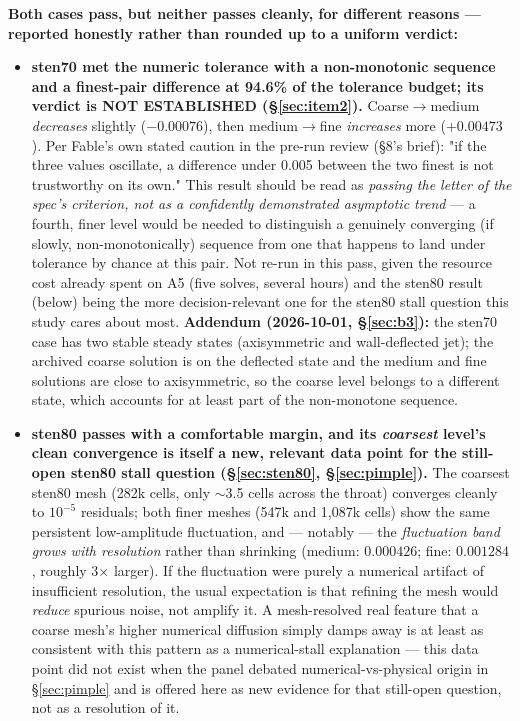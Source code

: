 \documentclass[11pt]{article}
\begin{document}
\textbf{Both cases pass, but neither passes cleanly, for different reasons --- reported honestly
rather than rounded up to a uniform verdict:}
\begin{itemize}
\item \textbf{sten70 met the numeric tolerance with a non-monotonic sequence and a finest-pair difference at 94.6\% of
the tolerance budget; its verdict is NOT ESTABLISHED (\S\ref{sec:item2}).} Coarse$\to$medium \emph{decreases} slightly ($-0.00076$), then medium$\to$fine
\emph{increases} more ($+0.00473$). Per Fable's own stated caution in the pre-run review (\S8's brief):
"if the three values oscillate, a difference under 0.005 between the two finest is not trustworthy on
its own." This result should be read as \emph{passing the letter of the spec's criterion, not as a
confidently demonstrated asymptotic trend} --- a fourth, finer level would be needed to distinguish a
genuinely converging (if slowly, non-monotonically) sequence from one that happens to land under
tolerance by chance at this pair. Not re-run in this pass, given the resource cost already spent on
A5 (five solves, several hours) and the sten80 result (below) being the more decision-relevant one for
the sten80 stall question this study cares about most. \textbf{Addendum (2026-10-01, \S\ref{sec:b3}):} the sten70 case has two stable steady states (axisymmetric and wall-deflected jet); the archived coarse solution is on the deflected state and the medium and fine solutions are close to axisymmetric, so the coarse level belongs to a different state, which accounts for at least part of the non-monotone sequence.
\item \textbf{sten80 passes with a comfortable margin, and its \emph{coarsest} level's clean
convergence is itself a new, relevant data point for the still-open sten80 stall question
(\S\ref{sec:sten80}, \S\ref{sec:pimple}).} The coarsest sten80 mesh (282k cells, only $\sim$3.5 cells
across the throat) converges cleanly to $10^{-5}$ residuals; both finer meshes (547k and 1{,}087k
cells) show the same persistent low-amplitude fluctuation, and --- notably --- the \emph{fluctuation
band grows with resolution} rather than shrinking (medium: $0.000426$; fine: $0.001284$, roughly
3$\times$ larger). If the fluctuation were purely a numerical artifact of insufficient resolution, the
usual expectation is that refining the mesh would \emph{reduce} spurious noise, not amplify it. A
mesh-resolved real feature that a coarse mesh's higher numerical diffusion simply damps away is at
least as consistent with this pattern as a numerical-stall explanation --- this data point did not
exist when the panel debated numerical-vs-physical origin in \S\ref{sec:pimple} and is offered here as
new evidence for that still-open question, not as a resolution of it.
\end{itemize}
\end{document}
